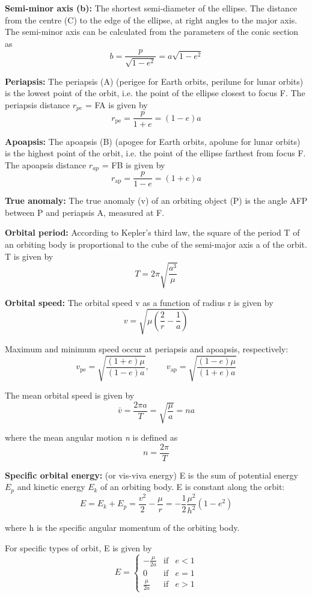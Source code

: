 \documentclass[Orbiter Developer Manual.tex]{subfiles}
\begin{document}
\noindent
\textbf{Semi-minor axis (b):} The shortest semi-diameter of the ellipse. The distance from the centre (C) to the edge of the ellipse, at right angles to the major axis. The semi-minor axis can be calculated from the parameters of the conic section as
\[ b = \frac{p}{\sqrt{1-e^2}} = a \sqrt{1-e^2} \]

\noindent
\textbf{Periapsis:} The periapsis (A) (perigee for Earth orbits, perilune for lunar orbits) is the lowest point of the orbit, i.e. the point of the ellipse closest to focus F. The periapsis distance $r_{pe}$ = FA is given by
\[ r_{\mathrm{pe}} = \frac{p}{1+e} = (1-e)a \]

\noindent
\textbf{Apoapsis:} The apoapsis (B) (apogee for Earth orbits, apolune for lunar orbits) is the highest point of the orbit, i.e. the point of the ellipse farthest from focus F. The apoapsis distance $r_{ap}$ = FB is given by
\[ r_{\mathrm{ap}} = \frac{p}{1-e} = (1+e)a \]

\noindent
\textbf{True anomaly:} The true anomaly (v) of an orbiting object (P) is the angle AFP between P and periapsis A, measured at F.

\noindent
\textbf{Orbital period:} According to Kepler's third law, the square of the period T of an orbiting body is proportional to the cube of the semi-major axis a of the orbit. T is given by
\[ T = 2\pi \sqrt{\frac{a^3}{\mu}} \]

\noindent
\textbf{Orbital speed:} The orbital speed v as a function of radius r is given by
\[ v = \sqrt{\mu\left(\frac{2}{r} - \frac{1}{a}\right)} \]

\noindent
Maximum and minimum speed occur at periapsis and apoapsis, respectively:
\[ v_\mathrm{pe} = \sqrt{\frac{(1+e)\mu}{(1-e)a}}, \qquad v_\mathrm{ap} = \sqrt{\frac{(1-e)\mu}{(1+e)a}} \]

\noindent
The mean orbital speed is given by
\[ \bar{v} = \frac{2\pi a}{T} = \sqrt{\frac{\mu}{a}} = na \]

\noindent
where the mean angular motion \textit{n} is defined as
\[ n = \frac{2 \pi} {T} \]

\noindent
\textbf{Specific orbital energy:} (or vis-viva energy) E is the sum of potential energy $E_{p}$ and kinetic energy $E_{k}$ of an orbiting body. E is constant along the orbit:
\[ E = E_k + E_p = \frac{v^2}{2} - \frac{\mu}{r} = -\frac{1}{2} \frac{\mu^2}{h^2} (1-e^2) \]

\noindent
where h is the specific angular momentum of the orbiting body.

For specific types of orbit, E is given by
\[
E = \left\lbrace \begin{array}{cll}
-\frac{\mu}{2a} & \mathrm{if} & e < 1 \\
0 & \mathrm{if} & e = 1 \\
\frac{\mu}{2a} & \mathrm{if} & e > 1
\end{array}\right.
\]
\end{document}
